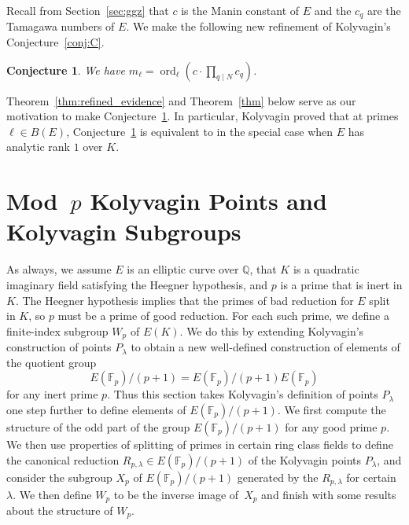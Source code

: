\documentclass{oupau}
\DeclareMathOperator{\ord}{ord}
\newcommand{\FF}{\mathbb{F}}
\newcommand{\QQ}{\mathbb{Q}}
\newtheorem{conjecture}[theorem]{Conjecture}
\begin{document}
Recall from Section~\ref{sec:ggz} that $c$ is the Manin constant of
$E$ and the $c_q$ are the Tamagawa numbers of $E$.  We make the
following new refinement of Kolyvagin's Conjecture~\ref{conj:C}. 
\begin{conjecture}\label{conj:refined}
We have $m_{\ell} = \ord_{\ell}(c \cdot \prod_{q\mid N} c_q)$.
\end{conjecture}
Theorem~\ref{thm:refined_evidence} and Theorem~\ref{thm} below serve
as our motivation to make Conjecture~\ref{conj:refined}.  In
particular, Kolyvagin proved that at primes $\ell\in B(E)$,
Conjecture~\ref{conj:refined} is equivalent to \cite[Conj~2.2, pg
311]{gross-zagier} in the special case when $E$ has analytic rank $1$
over $K$.

\section{Mod~$p$ Kolyvagin Points and Kolyvagin Subgroups} 
\label{sec:kolysubgroups} 

As always, we assume $E$ is an elliptic curve over $\QQ$, that $K$ is
a quadratic imaginary field satisfying the Heegner hypothesis, and $p$
is a prime that is inert in $K$.  The Heegner hypothesis implies that
the primes of bad reduction for $E$ split in $K$, so $p$ must be a
prime of good reduction.  For each such prime, we define a
finite-index subgroup $W_p$ of $E(K)$.  We do this by extending
Kolyvagin's construction of points $P_{\lambda}$ to obtain a new
well-defined construction of elements of the quotient group
$$
E(\FF_p)/(p+1) = E(\FF_p)/(p+1) E(\FF_p)
$$ 
for any inert prime $p$.  Thus this section takes Kolyvagin's
definition of points $P_{\lambda}$ one step further to define elements
of $E(\FF_p)/(p+1)$.  We first compute the structure of the odd part
of the group $E(\FF_p)/(p+1)$ for any good prime $p$. We then use
properties of splitting of primes in certain ring class fields to
define the canonical reduction $R_{p,\lambda}\in E(\FF_p)/(p+1)$ of
the Kolyvagin points $P_{\lambda}$, and consider the subgroup $X_p$ of
$E(\FF_p)/(p+1)$ generated by the $R_{p,\lambda}$ for certain
$\lambda$.  We then define $W_p$ to be the inverse image of~$X_p$
and finish with some results about the structure of $W_p$.
\end{document}
